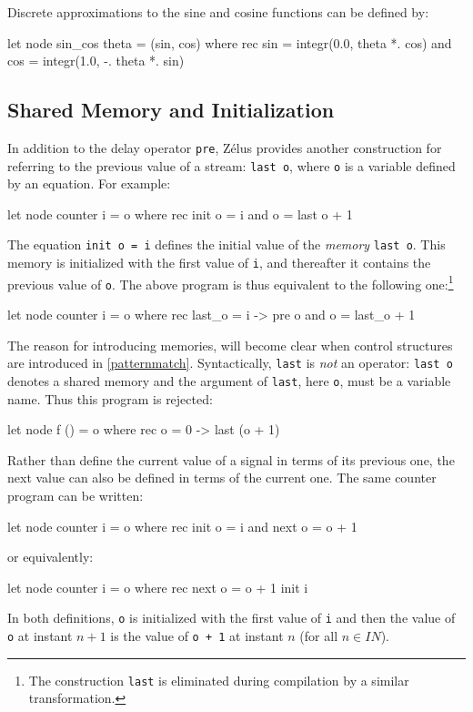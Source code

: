 \documentclass[11pt,titlepage,twoside]{report}
\newcommand{\zls}[1]{\texttt{#1}}
\newcommand{\Nat}{I\!\!N}
\begin{document}
\noindent Discrete approximations to the sine and cosine functions can be 
defined by:
\begin{chklisting}[continue,include=integr]
let node sin_cos theta = (sin, cos) where
  rec sin = integr(0.0, theta *. cos)
  and cos = integr(1.0, -. theta *. sin)
\end{chklisting}

\subsection{Shared Memory and Initialization\label{sharedinit}} %

In addition to the delay operator \zls{pre}, Zélus provides another 
construction for referring to the previous value of a stream: \zls{last o}, 
where \zls{o} is a variable defined by an equation. For example:%
\begin{chklisting}
let node counter i = o where
  rec init o = i
  and o = last o + 1
\end{chklisting}
The equation \zls{init o = i} defines the initial value of the \emph{memory} 
\zls{last o}. This memory is initialized with the first
value of \verb-i-, and thereafter it contains the previous value of
\verb-o-. The above program is thus equivalent to the following
one:\footnote{The construction \texttt{last} is eliminated during 
compilation by a similar transformation.}
\begin{chklisting}
let node counter i = o where
  rec last_o = i -> pre o
  and o = last_o + 1
\end{chklisting}
The reason for introducing memories, will become clear when control 
structures are introduced in \cref{patternmatch}.
Syntactically, \verb-last- is {\em not} an operator: \verb-last o- denotes
a shared memory and the argument of \verb-last-, here \verb-o-, must be a 
variable name. Thus this program is rejected:
\begin{chklisting}
let node f () = o where
  rec o = 0 -> last (o + 1)
\end{chklisting}

Rather than define the current value of a signal in terms of its previous
one, the next value can also be defined in terms of the current one.
The same counter program can be written:
\begin{chklisting}
let node counter i = o where
  rec init o = i
  and next o = o + 1
\end{chklisting}
or equivalently:
\begin{chklisting}
let node counter i = o where
  rec next o = o + 1 init i
\end{chklisting}
In both definitions, \texttt{o} is initialized with the first value of
\verb-i- and then the value of \texttt{o} at instant $n+1$ is the value of
\verb-o + 1- at instant $n$ (for all $n \in \Nat$).
\end{document}
